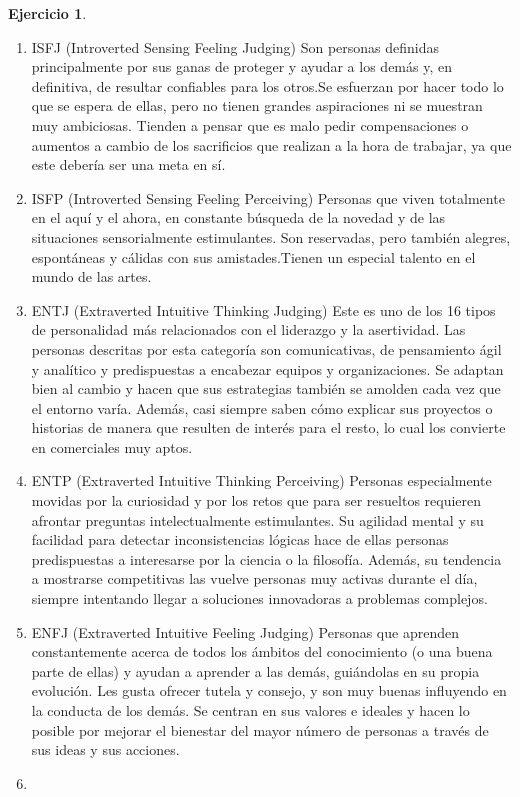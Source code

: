 \documentclass[10pt,]{krantz}
\theoremstyle{definition}
\theoremstyle{definition}
\theoremstyle{definition}
\newtheorem{exercise}{Ejercicio}[chapter]
\theoremstyle{definition}
\theoremstyle{remark}
\begin{document}
\begin{exercise}
\begin{enumerate}
\item
  ISFJ (Introverted Sensing Feeling Judging)
  Son personas definidas principalmente por sus ganas de proteger y ayudar a los demás y, en definitiva, de resultar confiables para los otros.Se esfuerzan por hacer todo lo que se espera de ellas, pero no tienen grandes aspiraciones ni se muestran muy ambiciosas. Tienden a pensar que es malo pedir compensaciones o aumentos a cambio de los sacrificios que realizan a la hora de trabajar, ya que este debería ser una meta en sí.
\item
  ISFP (Introverted Sensing Feeling Perceiving)
  Personas que viven totalmente en el aquí y el ahora, en constante búsqueda de la novedad y de las situaciones sensorialmente estimulantes. Son reservadas, pero también alegres, espontáneas y cálidas con sus amistades.Tienen un especial talento en el mundo de las artes.
\item
  ENTJ (Extraverted Intuitive Thinking Judging)
  Este es uno de los 16 tipos de personalidad más relacionados con el liderazgo y la asertividad. Las personas descritas por esta categoría son comunicativas, de pensamiento ágil y analítico y predispuestas a encabezar equipos y organizaciones. Se adaptan bien al cambio y hacen que sus estrategias también se amolden cada vez que el entorno varía. Además, casi siempre saben cómo explicar sus proyectos o historias de manera que resulten de interés para el resto, lo cual los convierte en comerciales muy aptos.
\item
  ENTP (Extraverted Intuitive Thinking Perceiving)
  Personas especialmente movidas por la curiosidad y por los retos que para ser resueltos requieren afrontar preguntas intelectualmente estimulantes. Su agilidad mental y su facilidad para detectar inconsistencias lógicas hace de ellas personas predispuestas a interesarse por la ciencia o la filosofía. Además, su tendencia a mostrarse competitivas las vuelve personas muy activas durante el día, siempre intentando llegar a soluciones innovadoras a problemas complejos.
\item
  ENFJ (Extraverted Intuitive Feeling Judging)
  Personas que aprenden constantemente acerca de todos los ámbitos del conocimiento (o una buena parte de ellas) y ayudan a aprender a las demás, guiándolas en su propia evolución. Les gusta ofrecer tutela y consejo, y son muy buenas influyendo en la conducta de los demás. Se centran en sus valores e ideales y hacen lo posible por mejorar el bienestar del mayor número de personas a través de sus ideas y sus acciones.
\item

\end{enumerate}
\end{exercise}
\end{document}
